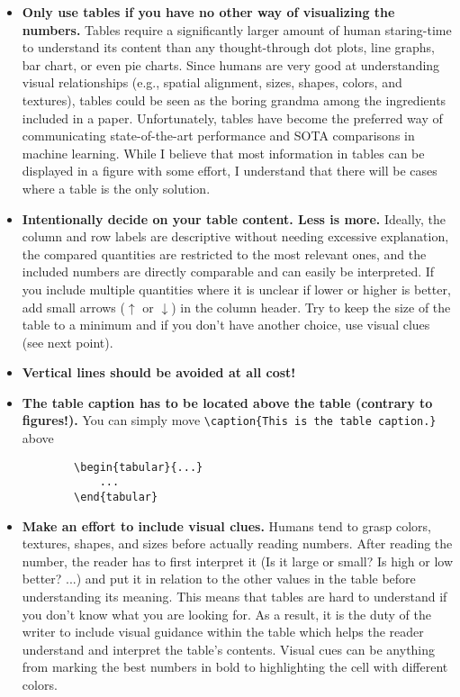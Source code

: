 \documentclass{article}
\begin{document}
\begin{itemize}
    \item \textbf{Only use tables if you have no other way of visualizing the numbers.} 
    Tables require a significantly larger amount of human staring-time to understand its content than any thought-through dot plots, line graphs, bar chart, or even pie charts.
    Since humans are very good at understanding visual relationships (e.g., spatial alignment, sizes, shapes, colors, and textures), tables could be seen as the boring grandma among the ingredients included in a paper. 
    Unfortunately, tables have become the preferred way of communicating state-of-the-art performance and SOTA comparisons in machine learning.
    While I believe that most information in tables can be displayed in a figure with some effort, I understand that there will be cases where a table is the only solution.
    \item \textbf{Intentionally decide on your table content. Less is more.} 
    Ideally, the column and row labels are descriptive without needing excessive explanation, the compared quantities are restricted to the most relevant ones, and the included numbers are directly comparable and can easily be interpreted.
    If you include multiple quantities where it is unclear if lower or higher is better, add small arrows ($\uparrow$ or $\downarrow$) in the column header.
    Try to keep the size of the table to a minimum and if you don't have another choice, use visual clues (see next point).
    \item \textbf{Vertical lines should be avoided at all cost!}
    \item \textbf{The table caption has to be located above the table (contrary to figures!).} You can simply move \verb|\caption{This is the table caption.}| above \begin{verbatim}
        \begin{tabular}{...}
            ...
        \end{tabular}
    \end{verbatim}
    \item \textbf{Make an effort to include visual clues.}
    Humans tend to grasp colors, textures, shapes, and sizes before actually reading numbers. 
    After reading the number, the reader has to first interpret it (Is it large or small? Is high or low better? ...) and put it in relation to the other values in the table before understanding its meaning.
    This means that tables are hard to understand if you don't know what you are looking for.
    As a result, it is the duty of the writer to include visual guidance within the table which helps the reader understand and interpret the table's contents.
    Visual cues can be anything from marking the best numbers in bold to highlighting the cell with different colors.
\end{itemize}
\end{document}
